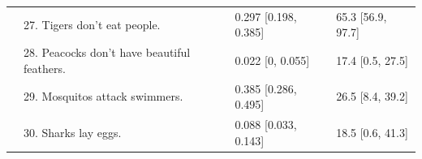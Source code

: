 \documentclass[12pt,letterpaper]{article}
\begin{document}
\begin{table}[h]
\begin{tabular}{| l | l | p{3.5cm} | p{3.5cm} |}
                                              & 27. Tigers don't eat people.                       &0.297 [0.198, 0.385]& 65.3 [56.9, 97.7]\\                                              
                                              & 28. Peacocks don't have beautiful feathers.                       &0.022 [0, 0.055] & 17.4 [0.5, 27.5]\\                                              
                                               & 29. Mosquitos attack swimmers.       &0.385 [0.286, 0.495] & 26.5 [8.4, 39.2]\\
			                         & 30. Sharks lay eggs.       &0.088 [0.033, 0.143] & 18.5 [0.6, 41.3]\\
\hline

\end{tabular}

\label{tab:expt1}
\end{table}


    
\end{document}
